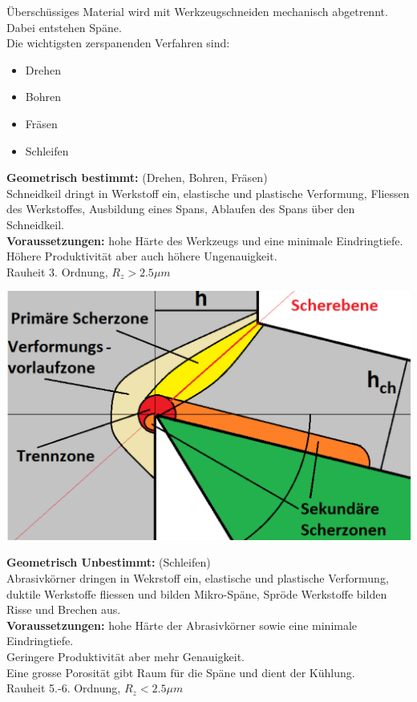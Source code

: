 Überschüssiges Material wird mit Werkzeugschneiden mechanisch abgetrennt. Dabei entstehen Späne.\\

Die wichtigsten zerspanenden Verfahren sind:
\begin{itemize}
    \item Drehen
    \item Bohren
    \item Fräsen
    \item Schleifen
\end{itemize}

\textbf{Geometrisch bestimmt:} \hfill (Drehen, Bohren, Fräsen)\\
Schneidkeil dringt in Werkstoff ein, elastische und plastische 
Verformung, Fliessen des Werkstoffes, Ausbildung eines Spans, 
Ablaufen des Spans über den Schneidkeil.\\

\textbf{Voraussetzungen:} hohe Härte des Werkzeugs und eine minimale Eindringtiefe.\\
Höhere Produktivität aber auch höhere Ungenauigkeit.\\
Rauheit 3. Ordnung, $R_z > 2.5 \mu m$\\
\begin{center}
    \includegraphics[width=0.8\linewidth]{src/images/Spanen.jpeg}\\
\end{center}
\textbf{Geometrisch Unbestimmt:} \hfill (Schleifen)\\
Abrasivkörner dringen in Wekrstoff ein, elastische und plastische 
Verformung, duktile Werkstoffe fliessen und bilden Mikro-Späne, 
Spröde Werkstoffe bilden Risse und Brechen aus. \\

\textbf{Voraussetzungen:} hohe Härte der Abrasivkörner sowie eine minimale Eindringtiefe.\\
Geringere Produktivität aber mehr Genauigkeit.\\
Eine grosse Porosität gibt Raum für die Späne und dient der Kühlung. \\
Rauheit 5.-6. Ordnung, $R_z < 2.5 \mu m$\\